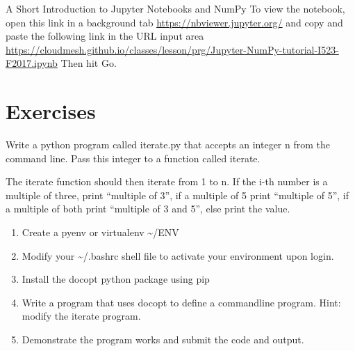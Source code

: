 A Short Introduction to Jupyter Notebooks and NumPy To view the
notebook, open this link in a background tab
\url{https://nbviewer.jupyter.org/} and copy and paste the following
link in the URL input area
\url{https://cloudmesh.github.io/classes/lesson/prg/Jupyter-NumPy-tutorial-I523-F2017.ipynb}
Then hit Go.


\section{Exercises}\label{exercises}

\begin{exercise}\label{E:Python.1}
Write a python program called iterate.py that accepts an integer n from
the command line. Pass this integer to a function called iterate.

The iterate function should then iterate from 1 to n. If the i-th number
is a multiple of three, print ``multiple of 3'', if a multiple of 5
print ``multiple of 5'', if a multiple of both print ``multiple of 3 and
5'', else print the value.
\end{exercise}

\begin{exercise}\label{E:Python.2}
  \begin{enumerate}
  \item
    Create a pyenv or virtualenv \textasciitilde{}/ENV
  \item
    Modify your \textasciitilde{}/.bashrc shell file to activate your
    environment upon login.
  \item
    Install the docopt python package using pip
  \item
    Write a program that uses docopt to define a commandline program.
    Hint: modify the iterate program.
  \item
    Demonstrate the program works and submit the code and output.
  \end{enumerate}
\end{exercise}


